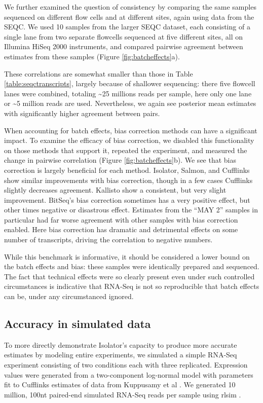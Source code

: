 \documentclass[twocolumn]{article}
\begin{document}
We further examined the question of consistency by comparing the same
samples sequenced on different flow cells and at different sites, again
using data from the SEQC. We used 10 samples from the larger SEQC
dataset, each consisting of a single lane from two separate
flowcells sequenced at five different sites, all on Illumina HiSeq 2000
instruments, and compared pairwise agreement between estimates from these
samples (Figure \ref{fig:batcheffects}a).

These correlations are somewhat smaller than those in Table
\ref{table:seqctranscripts},
largely because of shallower sequencing: there five flowcell lanes were
combined, totaling \textasciitilde{}25 millions reads per sample, here
only one lane or \textasciitilde{}5 million reads are used.
Nevertheless, we again see posterior mean estimates with significantly higher
agreement between pairs.

When accounting for batch effects, bias correction methods can have a
significant impact. To examine the efficacy of bias correction, we disabled this
functionality on those methods that support it, repeated the experiment, and
measured the change in pairwise correlation (Figure \ref{fig:batcheffects}b). We
see that bias correction is largely beneficial for each method. Isolator,
Salmon, and Cufflinks show similar improvements with bias correction, though in
a few cases Cufflinks slightly decreases agreement. Kallisto show a consistent,
but very slight improvement. BitSeq's bias correction sometimes has a very positive
effect, but other times negative or disastrous effect. Estimates from the ``MAY
2'' samples in particular had far worse agreement with other samples with bias
correction enabled. Here bias correction has dramatic and detrimental effects on
some number of transcripts, driving the correlation to negative numbers.

While this benchmark is informative, it should be considered a lower bound on
the batch effects and bias: these samples were identically prepared and
sequenced. The fact that technical effects were so clearly present even under
such controlled circumstances is indicative that RNA-Seq is not so reproducible
that batch effects can be, under any circumstanced ignored.

\subsection{Accuracy in simulated data}\label{accuracy-in-simulated-data}

To more directly demonstrate Isolator's capacity to produce more accurate
estimates by modeling entire experiments, we simulated a simple RNA-Seq
experiment consisting of two conditions each with three replicated. Expression
values were generated from a two-component log-normal model with parameters fit
to Cufflinks estimates of data from Kuppusamy et al \cite{Kuppusamy:2015ey}. We
generated 10 million, 100nt paired-end simulated RNA-Seq reads per sample using
rlsim \cite{Sipos:2013tz}.
\end{document}

